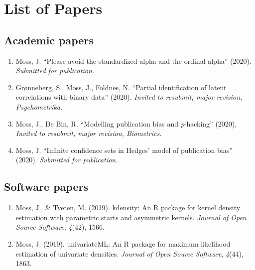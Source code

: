 \chapter{List of Papers}
\section*{Academic papers}
\begin{enumerate}

\item Moss, J. ``Please avoid the standardized alpha and the ordinal alpha''
(2020). \emph{Submitted for publication.}

\item Grønneberg, S., Moss, J., Foldnes, N. ``Partial identification of
latent correlations with binary data'' (2020). \emph{Invited to resubmit, major revision, Psychometrika.}

\item Moss, J., De Bin, R. ``Modelling publication bias and \emph{p}-hacking''
(2020), \emph{Invited to resubmit, major revision, Biometrics.}

\item Moss, J. ``Infinite confidence sets in Hedges' model of publication
bias'' (2020). \emph{Submitted for publication.}

\end{enumerate}

\section*{Software papers}
\begin{enumerate}
\item Moss, J., \& Tveten, M. (2019). kdensity: An R package for kernel
density estimation with parametric starts and asymmetric kernels.
\emph{Journal of Open Source Software}, \emph{4}(42), 1566.
\item Moss, J. (2019). univariateML: An R package for maximum likelihood
estimation of univariate densities. \emph{Journal of Open Source Software},
\emph{4}(44), 1863.
\end{enumerate}
